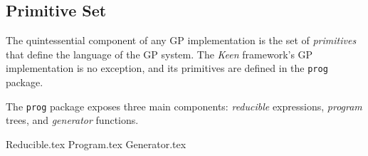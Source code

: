
\subsection{Primitive Set}
\label{sec:keen:gp:primitives}
  The quintessential component of any GP implementation is the set of \textit{primitives} that define the language of 
  the GP system. The \textit{Keen} framework's GP implementation is no exception, and its primitives are defined in the 
  \texttt{prog} package.

  The \texttt{prog} package exposes three main components: \emph{reducible} expressions, \emph{program} trees, and 
  \emph{generator} functions.

  {Reducible.tex}
  {Program.tex}
  {Generator.tex}
